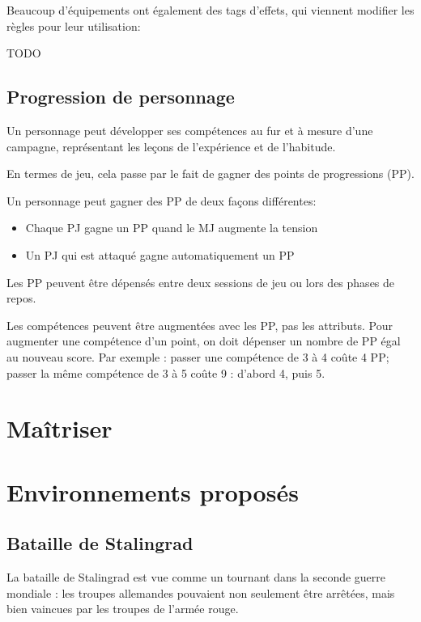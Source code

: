 \documentclass{report}
\begin{document}
\begin{multicols}{2}
Beaucoup d'équipements ont également des tags d'effets, qui viennent modifier les règles pour leur utilisation:
\begin{description}
\item[TODO]
\end{description}

\section{Progression de personnage}
Un personnage peut développer ses compétences au fur et à mesure d'une campagne, représentant les leçons de l'expérience et de l'habitude.

En termes de jeu, cela passe par le fait de gagner des points de progressions (PP).

Un personnage peut gagner des PP de deux façons différentes:
\begin{itemize}
    \item Chaque PJ gagne un PP quand le MJ augmente la tension
    \item Un PJ qui est attaqué gagne automatiquement un PP
\end{itemize}

Les PP peuvent être dépensés entre deux sessions de jeu ou lors des phases de repos.

Les compétences peuvent être augmentées avec les PP, pas les attributs. Pour augmenter une compétence d'un point, on doit dépenser un nombre de PP égal au nouveau score. Par exemple : passer une compétence de 3 à 4 coûte 4 PP; passer la même compétence de 3 à 5 coûte 9 : d'abord 4, puis 5.
\chapter{Maîtriser \diminutif}


\chapter{Environnements proposés}
\section{Bataille de Stalingrad}
La bataille de Stalingrad est vue comme un tournant dans la seconde guerre mondiale : les troupes allemandes pouvaient non seulement être arrêtées, mais bien vaincues par les troupes de l'armée rouge.


\end{multicols}
\end{document}
